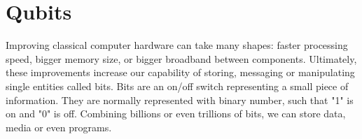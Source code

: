 
\section{Qubits}
Improving classical computer hardware can take many shapes: faster processing speed, bigger memory size, or bigger broadband between components. Ultimately, these improvements increase our capability of storing, messaging or manipulating single entities called bits. Bits are an on/off switch representing a small piece of information. They are normally represented with binary number, such that "1" is on and "0" is off. Combining billions or even trillions of bits, we can store data, media or even programs.

